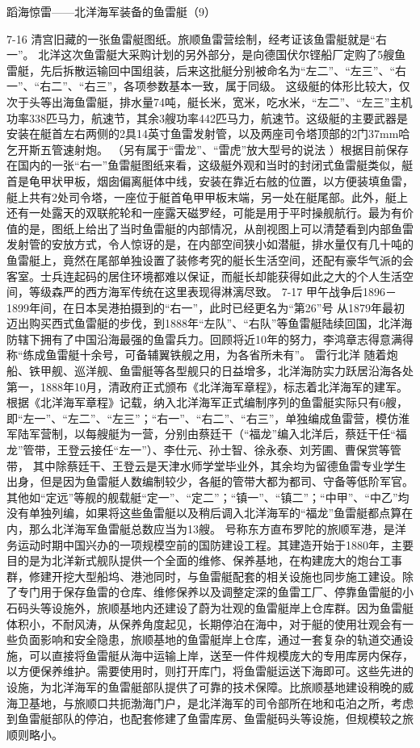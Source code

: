 \documentclass[12pt,UTF8]{ctexbook}
\begin{document}
蹈海惊雷——北洋海军装备的鱼雷艇（9）

7-16
清宫旧藏的一张鱼雷艇图纸。旅顺鱼雷营绘制，经考证该鱼雷艇就是“右一”。
北洋这次鱼雷艇大采购计划的另外部分，是向德国伏尔铿船厂定购了5艘鱼雷艇，先后拆散运输回中国组装，后来这批艇分别被命名为“左二”、“左三”、“右一”、“右二”、“右三”，各项参数基本一致，属于同级。 这级艇的体形比较大，仅次于头等出海鱼雷艇，排水量74吨，艇长米，宽米，吃水米，“左二”、“左三”主机功率338匹马力，航速节，其余3艘功率442匹马力，航速节。这级艇的主要武器是安装在艇首左右两侧的2具14英寸鱼雷发射管，以及两座司令塔顶部的2门37mm哈乞开斯五管速射炮。 （另有属于“雷龙”、“雷虎”放大型号的说法 ）根据目前保存在国内的一张“右一”鱼雷艇图纸来看，这级艇外观和当时的封闭式鱼雷艇类似，艇首是龟甲状甲板，烟囱偏离艇体中线，安装在靠近右舷的位置，以方便装填鱼雷，艇上共有2处司令塔，一座位于艇首龟甲甲板末端，另一处在艇尾部。此外，艇上还有一处露天的双联舵轮和一座露天磁罗经，可能是用于平时操舰航行。最为有价值的是，图纸上给出了当时鱼雷艇的内部情况，从剖视图上可以清楚看到内部鱼雷发射管的安放方式，令人惊讶的是，在内部空间狭小如潜艇，排水量仅有几十吨的鱼雷艇上，竟然在尾部单独设置了装修考究的艇长生活空间，还配有豪华气派的会客室。士兵连起码的居住环境都难以保证，而艇长却能获得如此之大的个人生活空间，等级森严的西方海军传统在这里表现得淋漓尽致。
7-17
甲午战争后1896－1899年间，在日本吴港拍摄到的“右一”，此时已经更名为“第26”号
从1879年最初迈出购买西式鱼雷艇的步伐，到1888年“左队”、“右队”等鱼雷艇陆续回国，北洋海防辖下拥有了中国沿海最强的鱼雷兵力。回顾将近10年的努力，李鸿章志得意满得称“练成鱼雷艇十余号，可备辅翼铁舰之用，为各省所未有”。
雷行北洋
随着炮船、铁甲舰、巡洋舰、鱼雷艇等各型舰只的日益增多，北洋海防实力跃居沿海各处第一，1888年10月，清政府正式颁布《北洋海军章程》，标志着北洋海军的建军。根据《北洋海军章程》记载，纳入北洋海军正式编制序列的鱼雷艇实际只有6艘，即“左一”、“左二”、“左三”；“右一”、“右二”、“右三”，单独编成鱼雷营，模仿淮军陆军营制，以每艘艇为一营，分别由蔡廷干（“福龙”编入北洋后，蔡廷干任“福龙”管带，王登云接任“左一”）、李仕元、孙士智、徐永泰、刘芳圃、曹保赏等管带， 其中除蔡廷干、王登云是天津水师学堂毕业外，其余均为留德鱼雷专业学生出身，但是因为鱼雷艇人数编制较少，各艇的管带大都为都司、守备等低阶军官。其他如“定远”等舰的舰载艇“定一”、“定二”；“镇一”、“镇二”；“中甲”、“中乙”均没有单独列编，如果将这些鱼雷艇以及稍后调入北洋海军的“福龙”鱼雷艇都点算在内，那么北洋海军鱼雷艇总数应当为13艘。
号称东方直布罗陀的旅顺军港，是洋务运动时期中国兴办的一项规模空前的国防建设工程。其建造开始于1880年，主要目的是为北洋新式舰队提供一个全面的维修、保养基地，在构建庞大的炮台工事群，修建开挖大型船坞、港池同时，与鱼雷艇配套的相关设施也同步施工建设。除了专门用于保存鱼雷的仓库、维修保养以及调整定深的鱼雷工厂、停靠鱼雷艇的小石码头等设施外，旅顺基地内还建设了蔚为壮观的鱼雷艇岸上仓库群。因为鱼雷艇体积小，不耐风涛，从保养角度起见，长期停泊在海中，对于艇的使用壮观会有一些负面影响和安全隐患，旅顺基地的鱼雷艇岸上仓库，通过一套复杂的轨道交通设施，可以直接将鱼雷艇从海中运输上岸，送至一件件规模庞大的专用库房内保存，以方便保养维护。需要使用时，则打开库门，将鱼雷艇运送下海即可。这些先进的设施，为北洋海军的鱼雷艇部队提供了可靠的技术保障。比旅顺基地建设稍晚的威海卫基地，与旅顺口共扼渤海门户，是北洋海军的司令部所在地和屯泊之所，考虑到鱼雷艇部队的停泊，也配套修建了鱼雷库房、鱼雷艇码头等设施，但规模较之旅顺则略小。
\end{document}
